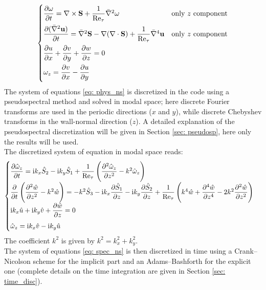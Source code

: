 \begin{equation}
\begin{cases}
\dfrac{\partial \mathbf{\omega}}{\partial t}=\nabla\times \mathbf{S}+\dfrac{1}{\textnormal{Re}_\tau}\bar\nabla^2\mathbf{\omega} & \textnormal{only $z$ component}\\[2ex]
\dfrac{\partial(\bar\nabla^2 \mathbf{u})}{\partial t}= \bar\nabla^2\mathbf{S}-\nabla(\nabla\cdot\mathbf{S})+\dfrac{1}{\textnormal{Re}_\tau}\bar\nabla^4\mathbf{u}    & \textnormal{only $z$ component}\\[2ex]
\dfrac{\partial u}{\partial x}+\dfrac{\partial v}{\partial y}+\dfrac{\partial w}{\partial z}=0\\[2ex]
\omega_z=\dfrac{\partial v}{\partial x}-\dfrac{\partial u}{\partial y}\\
\end{cases}
\label{eq: phys_ns}
\end{equation}
The system of equations \ref{eq: phys_ns} is discretized in the code using a pseudospectral method and solved in modal space; here discrete Fourier transforms are used in the periodic directions ($x$ and $y$), while discrete Chebyshev transforms in the wall-normal direction ($z$). A detailed explanation of the pseudospectral discretization will be given in Section \ref{sec: pseudosp}, here only the results will be used.\\
The discretized system of equation in modal space reads:
\begin{equation}
\begin{cases}
\dfrac{\partial \hat\omega_z}{\partial t}=\textnormal{i} k_x\hat S_2 -\textnormal{i}k_y\hat S_1 +\dfrac{1}{\textnormal{Re}_\tau}\left(\dfrac{\partial^2\hat\omega_z}{\partial z^2}-k^2\hat\omega_z   \right)  \\[2ex]
\dfrac{\partial}{\partial t}\left( \dfrac{\partial^2 \hat w}{\partial z^2}-k^2\hat w \right)=-k^2\hat S_3-\textnormal{i}k_x\dfrac{\partial \hat S_1}{\partial z}-\textnormal{i}k_y\dfrac{\partial \hat S_2}{\partial z} +\dfrac{1}{\textnormal{Re}_\tau}\left( k^4\hat w+\dfrac{\partial^4 \hat w}{\partial z^4}-2k^2\dfrac{\partial^2 \hat w}{\partial z^2}  \right) \\[2ex]
\textnormal{i}k_x \hat u+\textnormal{i}k_y\hat v+\dfrac{\partial\hat w}{\partial z}=0 \\[2ex]
\hat\omega_z=\textnormal{i}k_x\hat v-\textnormal{i} k_y\hat u
\end{cases}
\label{eq: spec_ns}
\end{equation}
The coefficient $k^2$ is given by $k^2=k_x^2+k_y^2$.\\
The system of equations \ref{eq: spec_ns} is then discretized in time using a Crank--Nicolson scheme for the implicit part and an Adams--Bashforth for the explicit one (complete details on the time integration are given in Section \ref{sec: time_disc}).\\
